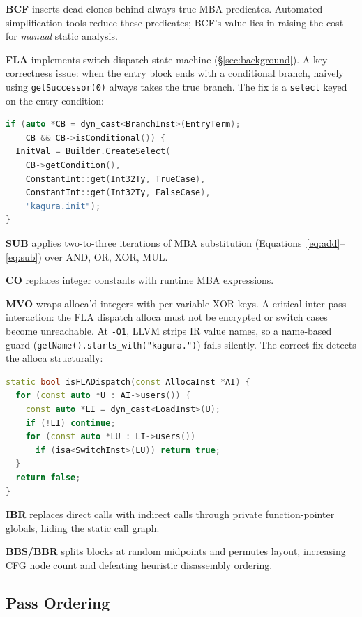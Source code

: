 \documentclass[conference]{IEEEtran}
\begin{document}
\textbf{BCF} inserts dead clones behind always-true MBA predicates.
Automated simplification tools reduce these predicates; BCF's value
lies in raising the cost for \emph{manual} static analysis.

\textbf{FLA} implements switch-dispatch state machine (\S\ref{sec:background}).
A key correctness issue: when the entry block ends with a conditional
branch, naively using \texttt{getSuccessor(0)} always takes the true
branch.
The fix is a \texttt{select} keyed on the entry condition:

\begin{lstlisting}[language=C++, float=h,
  caption={FLA: conditional entry initialisation.}]
if (auto *CB = dyn_cast<BranchInst>(EntryTerm);
    CB && CB->isConditional()) {
  InitVal = Builder.CreateSelect(
    CB->getCondition(),
    ConstantInt::get(Int32Ty, TrueCase),
    ConstantInt::get(Int32Ty, FalseCase),
    "kagura.init");
}
\end{lstlisting}

\textbf{SUB} applies two-to-three iterations of MBA substitution
(Equations~\eqref{eq:add}--\eqref{eq:sub}) over AND, OR, XOR, MUL.

\textbf{CO} replaces integer constants with runtime MBA expressions.

\textbf{MVO} wraps alloca'd integers with per-variable XOR keys.
A critical inter-pass interaction: the FLA dispatch alloca must not be
encrypted or switch cases become unreachable.
At \texttt{-O1}, LLVM strips IR value names, so a name-based guard
(\texttt{getName().starts\_with("kagura.")}) fails silently.
The correct fix detects the alloca structurally:

\begin{lstlisting}[language=C++,
  caption={MVO: structural FLA dispatch alloca guard.}]
static bool isFLADispatch(const AllocaInst *AI) {
  for (const auto *U : AI->users()) {
    const auto *LI = dyn_cast<LoadInst>(U);
    if (!LI) continue;
    for (const auto *LU : LI->users())
      if (isa<SwitchInst>(LU)) return true;
  }
  return false;
}
\end{lstlisting}

\textbf{IBR} replaces direct calls with indirect calls through private
function-pointer globals, hiding the static call graph.

\textbf{BBS/BBR} splits blocks at random midpoints and permutes layout,
increasing CFG node count and defeating heuristic disassembly ordering.

\subsection{Pass Ordering}
\end{document}
